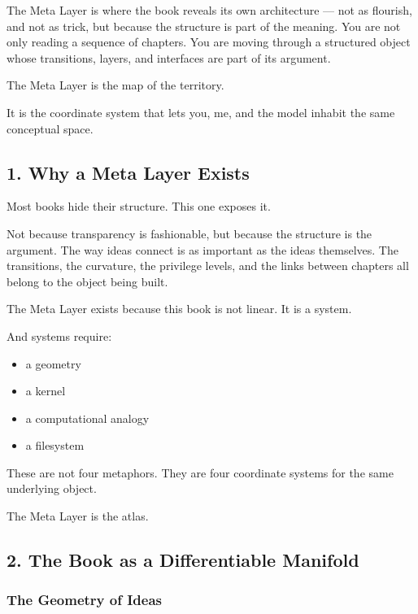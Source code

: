 \documentclass[
]{article}
\providecommand{\tightlist}{%
  \setlength{\itemsep}{0pt}\setlength{\parskip}{0pt}}
\begin{document}
The Meta Layer is where the book reveals its own architecture --- not as
flourish, and not as trick, but because the structure is part of the
meaning. You are not only reading a sequence of chapters. You are moving
through a structured object whose transitions, layers, and interfaces
are part of its argument.

The Meta Layer is the map of the territory.

It is the coordinate system that lets you, me, and the model inhabit the
same conceptual space.

\hypertarget{why-a-meta-layer-exists}{%
\subsection{1. Why a Meta Layer Exists}\label{why-a-meta-layer-exists}}

Most books hide their structure. This one exposes it.

Not because transparency is fashionable, but because the structure is
the argument. The way ideas connect is as important as the ideas
themselves. The transitions, the curvature, the privilege levels, and
the links between chapters all belong to the object being built.

The Meta Layer exists because this book is not linear. It is a system.

And systems require:

\begin{itemize}
\tightlist
\item
  a geometry
\item
  a kernel
\item
  a computational analogy
\item
  a filesystem
\end{itemize}

These are not four metaphors. They are four coordinate systems for the
same underlying object.

The Meta Layer is the atlas.

\hypertarget{the-book-as-a-differentiable-manifold}{%
\subsection{2. The Book as a Differentiable
Manifold}\label{the-book-as-a-differentiable-manifold}}

\hypertarget{the-geometry-of-ideas}{%
\subsubsection{The Geometry of Ideas}\label{the-geometry-of-ideas}}
\end{document}
